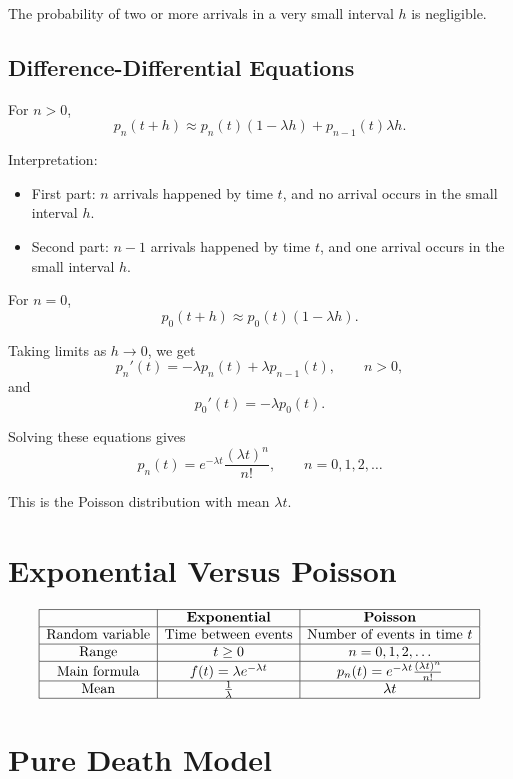 \documentclass[12pt]{article}
\begin{document}
The probability of two or more arrivals in a very small interval \(h\) is negligible.

\subsection*{Difference-Differential Equations}

For \(n>0\),
\[
p_n(t+h)\approx p_n(t)(1-\lambda h)+p_{n-1}(t)\lambda h.
\]

Interpretation:

\begin{itemize}
    \item First part: \(n\) arrivals happened by time \(t\), and no arrival occurs in the small interval \(h\).
    \item Second part: \(n-1\) arrivals happened by time \(t\), and one arrival occurs in the small interval \(h\).
\end{itemize}

For \(n=0\),
\[
p_0(t+h)\approx p_0(t)(1-\lambda h).
\]

Taking limits as \(h\to 0\), we get
\[
p_n'(t)=-\lambda p_n(t)+\lambda p_{n-1}(t),\qquad n>0,
\]
and
\[
p_0'(t)=-\lambda p_0(t).
\]

Solving these equations gives
\[
\boxed{
p_n(t)=e^{-\lambda t}\frac{(\lambda t)^n}{n!},\qquad n=0,1,2,\ldots
}
\]

This is the Poisson distribution with mean \(\lambda t\).

\section{Exponential Versus Poisson}

\[
\begin{array}{|c|c|c|}
\hline
 & \textbf{Exponential} & \textbf{Poisson}\\
\hline
\text{Random variable} & \text{Time between events} & \text{Number of events in time }t\\
\hline
\text{Range} & t\geq 0 & n=0,1,2,\ldots\\
\hline
\text{Main formula} & f(t)=\lambda e^{-\lambda t} & p_n(t)=e^{-\lambda t}\frac{(\lambda t)^n}{n!}\\
\hline
\text{Mean} & \frac{1}{\lambda} & \lambda t\\
\hline
\end{array}
\]

\section{Pure Death Model}
\end{document}
